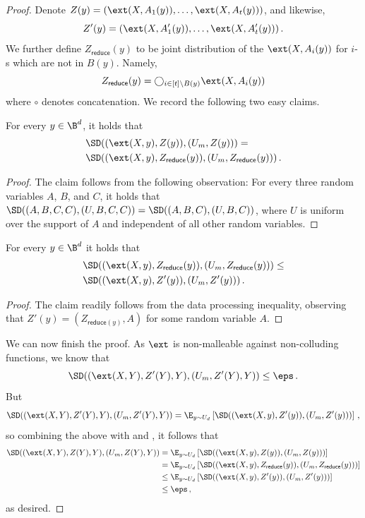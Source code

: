 \begin{proof}
Denote $Z(y) = ( \ext(X,A_{1}(y)),\ldots,\ext(X,A_{t}(y)) )$, and likewise,
\[Z'(y) = ( \ext(X,A'_{1}(y)),\ldots,\ext(X,A'_{t}(y)) )\,.\] We further
define $Z_{\mathsf{reduce}}(y)$ to be joint distribution of the $\ext(X,A_i(y))$ for $i$-s which
are not in $B(y)$. Namely,
\[
Z_{\mathsf{reduce}}(y) = \bigcirc_{i \in [t] \setminus B(y)} \ext(X,A_{i}(y))
\]
where $\circ$ denotes concatenation. 
We record the following two easy claims.
\begin{claim}\label{claim:sec41}
For every $y \in \B^d$,
it holds that
\begin{align*}
&\SD((\ext(X,y),Z(y)),(U_m,Z(y))) =  \\ &\SD((\ext(X,y),Z_{\mathsf{reduce}}(y)),(U_m,Z_{\mathsf{reduce}}(y)))\,.
\end{align*}
\end{claim}
\begin{proof}
The claim follows from the following observation: For every three random variables $A$, $B$, and $C$,
it holds that $\SD((A,B,C,C),(U,B,C,C)) = \SD((A,B,C),(U,B,C))$, where $U$ is uniform over the support of
$A$ and independent of all other random variables.
\end{proof}

\begin{claim}\label{claim:sec42}
For every $y \in \B^d$ it holds that
\begin{align*}
&\SD((\ext(X,y),Z_{\mathsf{reduce}}(y)),(U_m,Z_{\mathsf{reduce}}(y))) \le \\
&\SD((\ext(X,y),Z'(y)),(U_m,Z'(y)))\,.
\end{align*}
\end{claim}
\begin{proof}
The claim readily follows from the data processing inequality, observing that
$Z'(y) = (Z_{\mathsf{reduce}(y)},A)$ for some random variable $A$.
\end{proof}

We can now finish the proof. As $\ext$ is non-malleable against non-colluding functions,
we know that
\[
\SD((\ext(X,Y),Z'(Y),Y),(U_m,Z'(Y),Y)) \le \eps\,.
\]
But
\[
\SD((\ext(X,Y),Z'(Y),Y),(U_m,Z'(Y),Y))  = \E_{y \sim U_d}\left[ \SD((\ext(X,y),Z'(y)),(U_m,Z'(y))) \right]\,,
\]
so
combining the above with  and , it follows that
\begin{align*}
\SD((\ext(X,Y),Z(Y),Y),(U_m,Z(Y),Y)) &= \E_{y \sim U_d}\left[ \SD((\ext(X,y),Z(y)),(U_m,Z(y))) \right] \\
&= \E_{y \sim U_d}\left[ \SD((\ext(X,y),Z_{\mathsf{reduce}}(y)),(U_m,Z_{\mathsf{reduce}}(y))) \right] \\
&\le \E_{y \sim U_d}\left[ \SD((\ext(X,y),Z'(y)),(U_m,Z'(y))) \right] \\
&\le \eps\,,
\end{align*}
as desired. 
\end{proof}

